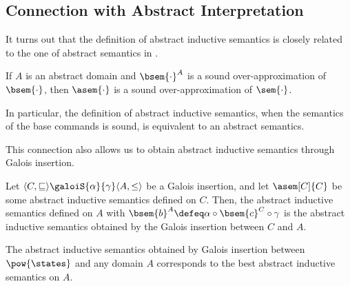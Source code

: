 \subsection{Connection with Abstract Interpretation}

It turns out that the definition of abstract inductive semantics is closely 
related to the one of abstract semantics in \cite{Cousot77}.

\begin{theorem}
  \label{thm:sound-ai}
  If $A$ is an abstract domain and $\bsem{\cdot}^A$ is a sound 
  over-approximation of $\bsem{\cdot}$, then $\asem{\cdot}$ is a sound 
  over-approximation of $\sem{\cdot}$.
\end{theorem}

In particular, the definition of abstract inductive semantics, when the 
semantics of the base commands is sound, is equivalent to an abstract semantics.

This connection also allows us to obtain abstract inductive semantics through 
Galois insertion.

\begin{definition}
  \label{def:aisgi}
  Let $\langle C, \sqsubseteq \rangle \galoiS{\alpha}{\gamma} \langle A, \leq 
  \rangle$ be a Galois insertion, and let $\asem[C]{C}$ be some abstract 
  inductive semantics defined on $C$. Then, the abstract inductive semantics 
  defined on $A$ with $\bsem{b}^A \defeq \alpha \circ \bsem{c}^C \circ \gamma$ is the 
  abstract inductive semantics obtained by the Galois insertion between $C$ and $A$.
\end{definition}

The abstract inductive semantics obtained by Galois insertion between 
$\pow{\states}$ and any domain $A$ corresponds to the best abstract inductive 
semantics on $A$.
